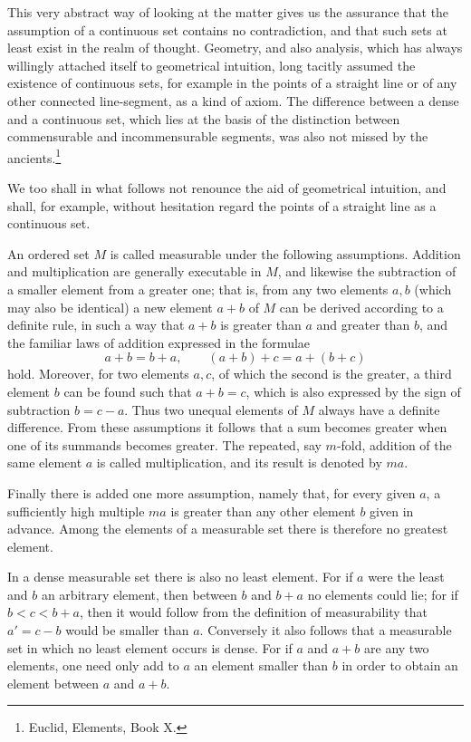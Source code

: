 \documentclass[11pt]{article}
\begin{document}
This very abstract way of looking at the matter gives us the assurance that the assumption of a continuous set contains no contradiction, and that such sets at least exist in the realm of thought. Geometry, and also analysis, which has always willingly attached itself to geometrical intuition, long tacitly assumed the existence of continuous sets, for example in the points of a straight line or of any other connected line-segment, as a kind of axiom. The difference between a dense and a continuous set, which lies at the basis of the distinction between commensurable and incommensurable segments, was also not missed by the ancients.\footnote{Euclid, Elements, Book X.}

We too shall in what follows not renounce the aid of geometrical intuition, and shall, for example, without hesitation regard the points of a straight line as a continuous set.

An ordered set $M$ is called measurable under the following assumptions. Addition and multiplication are generally executable in $M$, and likewise the subtraction of a smaller element from a greater one; that is, from any two elements $a,b$ (which may also be identical) a new element $a+b$ of $M$ can be derived according to a definite rule, in such a way that $a+b$ is greater than $a$ and greater than $b$, and the familiar laws of addition expressed in the formulae
\[
 a+b=b+a,
 \qquad (a+b)+c=a+(b+c)
\]
hold. Moreover, for two elements $a,c$, of which the second is the greater, a third element $b$ can be found such that $a+b=c$, which is also expressed by the sign of subtraction $b=c-a$. Thus two unequal elements of $M$ always have a definite difference. From these assumptions it follows that a sum becomes greater when one of its summands becomes greater. The repeated, say $m$-fold, addition of the same element $a$ is called multiplication, and its result is denoted by $ma$.

Finally there is added one more assumption, namely that, for every given $a$, a sufficiently high multiple $ma$ is greater than any other element $b$ given in advance. Among the elements of a measurable set there is therefore no greatest element.

In a dense measurable set there is also no least element. For if $a$ were the least and $b$ an arbitrary element, then between $b$ and $b+a$ no elements could lie; for if $b<c<b+a$, then it would follow from the definition of measurability that $a'=c-b$ would be smaller than $a$. Conversely it also follows that a measurable set in which no least element occurs is dense. For if $a$ and $a+b$ are any two elements, one need only add to $a$ an element smaller than $b$ in order to obtain an element between $a$ and $a+b$.
\end{document}
